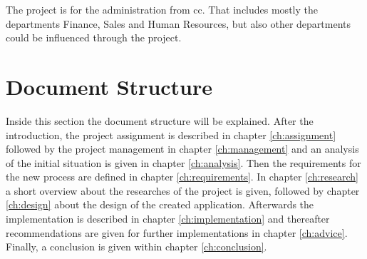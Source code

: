 The project is for the administration from \gls{cc}. That includes mostly the departments Finance, Sales and Human Resources, but also other departments could be influenced through the project.

\section{Document Structure}
Inside this section the document structure will be explained. After the introduction, the project assignment is described in chapter \ref{ch:assignment} followed by the project management in chapter \ref{ch:management} and an analysis of the initial situation is given in chapter \ref{ch:analysis}. Then the requirements for the new process are defined in chapter \ref{ch:requirements}. In chapter \ref{ch:research} a short overview about the researches of the project is given, followed by chapter \ref{ch:design} about the design of the created application. Afterwards the implementation is described in chapter \ref{ch:implementation} and thereafter recommendations are given for further implementations in chapter \ref{ch:advice}. Finally, a conclusion is given within chapter \ref{ch:conclusion}.